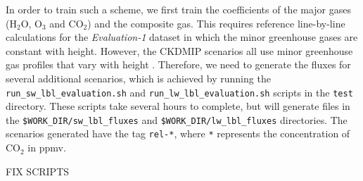 \documentclass[a4,oneside]{article}
\def\codesize{\small}
\def\codesize{\small}
\def\code#1{{\codesize\texttt{#1}}}
\begin{document}
In order to train such a scheme, we first train the coefficients of
the major gases (H$_2$O, O$_3$ and CO$_2$) and the composite gas. This
requires reference line-by-line calculations for the
\emph{Evaluation-1} dataset in which the minor greenhouse gases are
constant with height.  However, the CKDMIP scenarios all use minor
greenhouse gas profiles that vary with height \citep[see Fig.\ 2
  of][]{Hogan&2020}. Therefore, we need to generate the fluxes for
several additional scenarios, which is achieved by running the
\code{run\_sw\_lbl\_evaluation.sh} and
\code{run\_lw\_lbl\_evaluation.sh} scripts in the \code{test}
directory. These scripts take several hours to complete, but will
generate files in the \code{\$WORK\_DIR/sw\_lbl\_fluxes} and
\code{\$WORK\_DIR/lw\_lbl\_fluxes} directories. The scenarios
generated have the tag \code{rel-*}, where \code{*} represents the
concentration of CO$_2$ in ppmv.

FIX SCRIPTS
\end{document}
